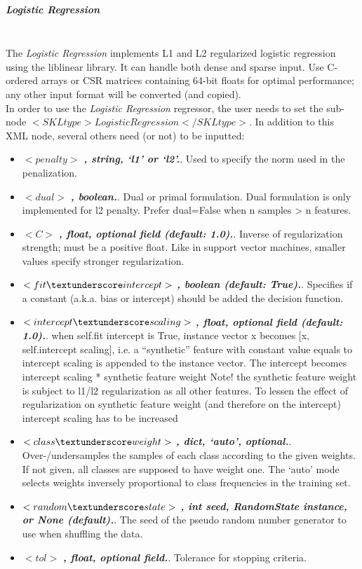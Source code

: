 \subparagraph{Logistic Regression }
\mbox{}
\\The \textit{Logistic Regression} implements L1 and L2 regularized logistic regression using the liblinear library. It can handle both dense and sparse input. Use C-ordered arrays or CSR matrices containing 64-bit floats for optimal performance; any other input format will be converted (and copied).
\\In order to use the \textit{Logistic Regression} regressor, the user needs to set the sub-node $<SKLtype>LogisticRegression</SKLtype>$.
In addition to this XML node, several others need (or not) to be inputted:
\begin{itemize}
  \item $<penalty>$ \textbf{\textit{, string, ‘l1’ or ‘l2’.}}. Used to specify the norm used in the penalization.
  \item $<dual>$ \textbf{\textit{, boolean.}}. Dual or primal formulation. Dual formulation is only implemented for l2 penalty. Prefer dual=False when n \textunderscore samples > n \textunderscore features.
  \item $<C>$ \textbf{\textit{, float, optional field (default: 1.0).}}. Inverse of regularization strength; must be a positive float. Like in support vector machines, smaller values specify stronger regularization.
  \item $<fit \textunderscore intercept>$ \textbf{\textit{, boolean (default: True).}}. Specifies if a constant (a.k.a. bias or intercept) should be added the decision function.
  \item $<intercept \textunderscore scaling>$ \textbf{\textit{, float, optional field (default: 1.0).}}. when self.fit \textunderscore intercept is True, instance vector x becomes [x, self.intercept \textunderscore scaling], i.e. a “synthetic” feature with constant value equals to intercept \textunderscore scaling is appended to the instance vector. The intercept becomes intercept \textunderscore scaling * synthetic feature weight Note! the synthetic feature weight is subject to l1/l2 regularization as all other features. To lessen the effect of regularization on synthetic feature weight (and therefore on the intercept) intercept \textunderscore scaling has to be increased
  \item $<class \textunderscore weight>$ \textbf{\textit{, {dict, ‘auto’}, optional.}}. Over-/undersamples the samples of each class according to the given weights. If not given, all classes are supposed to have weight one. The ‘auto’ mode selects weights inversely proportional to class frequencies in the training set.
  \item $<random \textunderscore state>$ \textbf{\textit{, int seed, RandomState instance, or None (default).}}. The seed of the pseudo random number generator to use when shuffling the data.
  \item $<tol>$ \textbf{\textit{, float, optional field.}}. Tolerance for stopping criteria.
\end{itemize}

